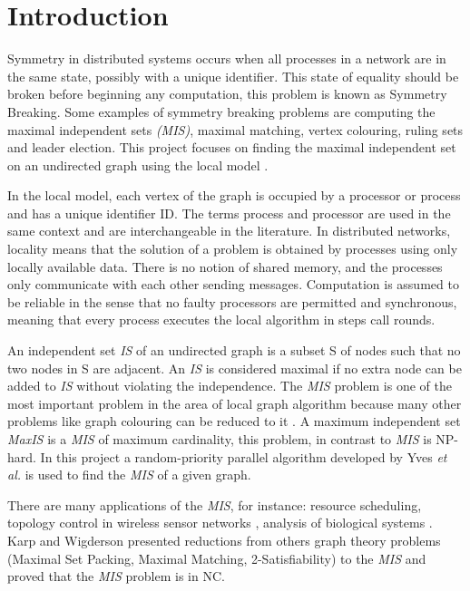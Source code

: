 \section{Introduction}
\label{cap:1}

Symmetry in distributed systems occurs when all processes in a network are in the same state, possibly with a unique identifier. This state of equality should be broken before beginning any computation, this problem is known as Symmetry Breaking. Some examples of symmetry breaking problems are computing the maximal independent sets \textit{(MIS)}, maximal matching, vertex colouring, ruling sets and leader election. This project focuses on finding the maximal independent set on an undirected graph using the local model \cite{linial1992locality}.

In the local model, each vertex of the graph is occupied by a processor or process and has a unique identifier ID. The terms process and processor are used in the same context and are interchangeable in the literature. In distributed networks, locality means that the solution of a problem is obtained by processes using only locally available data. There is no notion of shared memory, and the processes only communicate with each other sending messages. Computation is assumed to be reliable in the sense that no faulty processors are permitted and synchronous, meaning that every process executes the local algorithm in steps call rounds.  

An independent set \textit{IS} of an undirected graph is a subset S of nodes such that no two nodes in S are adjacent. An \textit{IS} is considered maximal if no extra node can be added to \textit{IS} without violating the independence. The \textit{MIS} problem is one of the most important problem in the area of local graph algorithm because many other problems like graph colouring can be reduced to it \cite{panconesi1992improved}. A maximum independent set \textit{MaxIS} is a \textit{MIS} of maximum cardinality, this problem, in contrast to \textit{MIS} is NP-hard. In this project a random-priority parallel algorithm developed by Yves \textit{et al.} \cite{yves2009optimal} is used to find the \textit{MIS} of a given graph.

There are many applications of the \textit{MIS}, for instance: resource scheduling, topology control in wireless sensor networks \cite{basagni2001finding}, analysis of biological systems \cite{afek2013beeping}. Karp and Wigderson \cite{karp1986constructing} presented reductions from \newline others graph theory problems (Maximal Set Packing, Maximal Matching, 2-Satisfiability) to the \textit{MIS} and proved that the \textit{MIS} problem is in NC.

